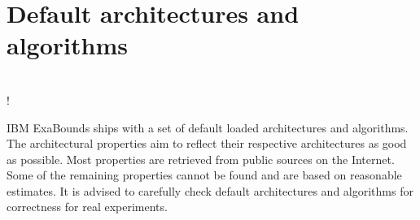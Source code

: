 \section{Default architectures and algorithms}

\begin{minipage}[t]{0.05\textwidth}
~\\
\Huge !
\end{minipage}
\begin{minipage}[t]{0.94\textwidth}
IBM ExaBounds ships with a set of default loaded architectures and algorithms. The architectural properties aim to reflect their respective architectures as good as possible. Most properties are retrieved from public sources on the Internet. Some of the remaining properties cannot be found and are based on reasonable estimates. It is advised to carefully check default architectures and algorithms for correctness for real experiments.\end{minipage}
~\linebreak
